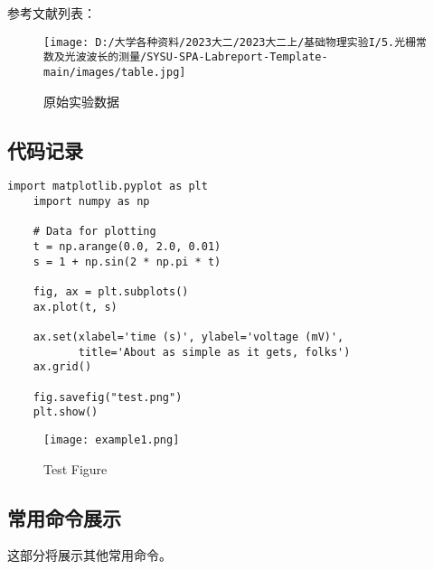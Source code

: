 \documentclass[dvipsnames, svgnames,a4paper,11pt]{article}
\begin{document}
参考文献列表：


\begin{figure}[H]
	\centering
	\texttt{[image: D:/大学各种资料/2023大二/2023大二上/基础物理实验I/5.光栅常数及光波波长的测量/SYSU-SPA-Labreport-Template-main/images/table.jpg]}
	\caption{原始实验数据}
\end{figure}
	
\clearpage
{}



\clearpage
\appendix
\appendixpage
\addappheadtotoc
\subsection{代码记录}
\begin{lstlisting}[style=pythonstyle,caption=代码记录示例]
	import matplotlib.pyplot as plt
	import numpy as np
	
	# Data for plotting
	t = np.arange(0.0, 2.0, 0.01)
	s = 1 + np.sin(2 * np.pi * t)
	
	fig, ax = plt.subplots()
	ax.plot(t, s)
	
	ax.set(xlabel='time (s)', ylabel='voltage (mV)',
		   title='About as simple as it gets, folks')
	ax.grid()
	
	fig.savefig("test.png")
	plt.show()
\end{lstlisting}
\begin{figure}[H]
    \centering
    \texttt{[image: example1.png]}
    \caption{Test Figure}
\end{figure}

\clearpage
\subsection{常用命令展示}
这部分将展示其他常用命令。
\end{document}

